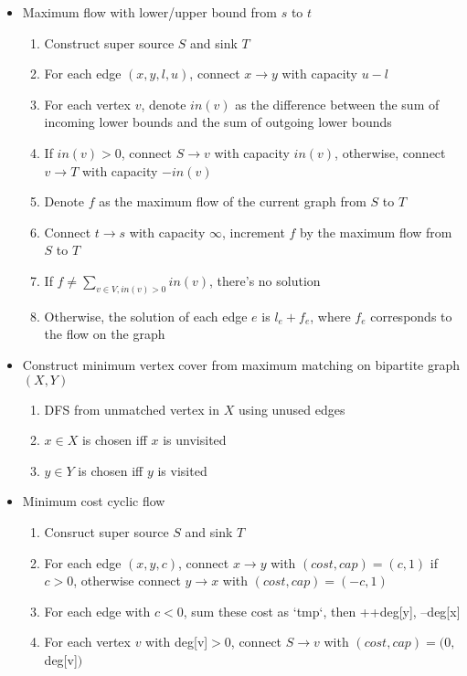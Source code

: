 \normalsize
\begin{itemize}
    \item Maximum flow with lower/upper bound from $s$ to $t$
    \begin{enumerate}
        \item Construct super source $S$ and sink $T$
        \item For each edge $(x, y, l, u)$, connect $x \rightarrow y$ with capacity $u - l$
        \item For each vertex $v$, denote $in(v)$ as the difference between the sum of incoming lower bounds and the sum of outgoing lower bounds
        \item If $in(v) > 0$, connect $S \rightarrow v$ with capacity $in(v)$, otherwise, connect $v \rightarrow T$ with capacity $-in(v)$
        \item Denote $f$ as the maximum flow of the current graph from $S$ to $T$
        \item Connect $t \rightarrow s$ with capacity $\infty$, increment $f$ by the maximum flow from $S$ to $T$
        \item If $f \neq \sum_{v \in V, in(v) > 0}{in(v)}$, there's no solution
        \item Otherwise, the solution of each edge $e$ is $l_e + f_e$, where $f_e$ corresponds to the flow on the graph
    \end{enumerate}
    \item Construct minimum vertex cover from maximum matching on bipartite graph $(X, Y)$
    \begin{enumerate}
        \item DFS from unmatched vertex in $X$ using unused edges
        \item $x \in X$ is chosen iff $x$ is unvisited
        \item $y \in Y$ is chosen iff $y$ is visited
    \end{enumerate}
    \item Minimum cost cyclic flow
    \begin{enumerate}
        \item Consruct super source $S$ and sink $T$
        \item For each edge $(x, y, c)$, connect $x \rightarrow y$ with $(cost, cap) = (c, 1)$ if $c > 0$, otherwise connect $y \rightarrow x$ with $(cost, cap) = (-c, 1)$
        \item For each edge with $c < 0$, sum these cost as `tmp`, then ++deg[y], --deg[x]
        \item For each vertex $v$ with deg[v]$> 0$, connect $S \rightarrow v$ with $(cost, cap) = (0, $deg[v]$)$

\end{enumerate}
\end{itemize}
